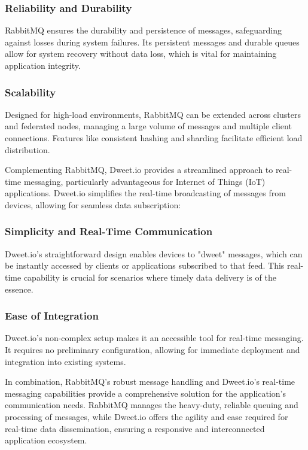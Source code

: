 \subsubsection{Reliability and Durability}
RabbitMQ ensures the durability and persistence of messages, safeguarding against losses during system failures. Its persistent messages and durable queues allow for system recovery without data loss, which is vital for maintaining application integrity.

\subsubsection{Scalability}
Designed for high-load environments, RabbitMQ can be extended across clusters and federated nodes, managing a large volume of messages and multiple client connections. Features like consistent hashing and sharding facilitate efficient load distribution.

Complementing RabbitMQ, Dweet.io provides a streamlined approach to real-time messaging, particularly advantageous for Internet of Things (IoT) applications. Dweet.io simplifies the real-time broadcasting of messages from devices, allowing for seamless data subscription:

\subsubsection{Simplicity and Real-Time Communication}
Dweet.io's straightforward design enables devices to "dweet" messages, which can be instantly accessed by clients or applications subscribed to that feed. This real-time capability is crucial for scenarios where timely data delivery is of the essence.

\subsubsection{Ease of Integration}
Dweet.io's non-complex setup makes it an accessible tool for real-time messaging. It requires no preliminary configuration, allowing for immediate deployment and integration into existing systems.

In combination, RabbitMQ's robust message handling and Dweet.io's real-time messaging capabilities provide a comprehensive solution for the application's communication needs. RabbitMQ manages the heavy-duty, reliable queuing and processing of messages, while Dweet.io offers the agility and ease required for real-time data dissemination, ensuring a responsive and interconnected application ecosystem.



